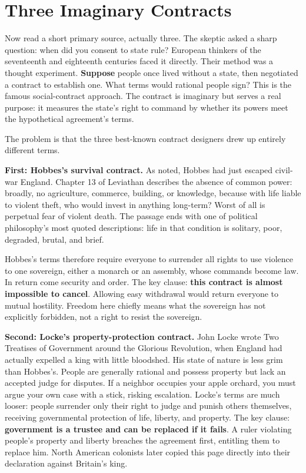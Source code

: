 \section{Three Imaginary Contracts}
Now read a short primary source, actually three. The skeptic asked a sharp question: when did you consent to state rule? European thinkers of the seventeenth and eighteenth centuries faced it directly. Their method was a thought experiment. \textbf{Suppose} people once lived without a state, then negotiated a contract to establish one. What terms would rational people sign? This is the famous social-contract approach. The contract is imaginary but serves a real purpose: it measures the state's right to command by whether its powers meet the hypothetical agreement's terms.

The problem is that the three best-known contract designers drew up entirely different terms.

\textbf{First: Hobbes's survival contract.} As noted, Hobbes had just escaped civil-war England. Chapter 13 of Leviathan describes the absence of common power: broadly, no agriculture, commerce, building, or knowledge, because with life liable to violent theft, who would invest in anything long-term? Worst of all is perpetual fear of violent death. The passage ends with one of political philosophy's most quoted descriptions: life in that condition is solitary, poor, degraded, brutal, and brief.

Hobbes's terms therefore require everyone to surrender all rights to use violence to one sovereign, either a monarch or an assembly, whose commands become law. In return come security and order. The key clause: \textbf{this contract is almost impossible to cancel}. Allowing easy withdrawal would return everyone to mutual hostility. Freedom here chiefly means what the sovereign has not explicitly forbidden, not a right to resist the sovereign.

\textbf{Second: Locke's property-protection contract.} John Locke wrote Two Treatises of Government around the Glorious Revolution, when England had actually expelled a king with little bloodshed. His state of nature is less grim than Hobbes's. People are generally rational and possess property but lack an accepted judge for disputes. If a neighbor occupies your apple orchard, you must argue your own case with a stick, risking escalation. Locke's terms are much looser: people surrender only their right to judge and punish others themselves, receiving governmental protection of life, liberty, and property. The key clause: \textbf{government is a trustee and can be replaced if it fails}. A ruler violating people's property and liberty breaches the agreement first, entitling them to replace him. North American colonists later copied this page directly into their declaration against Britain's king.

